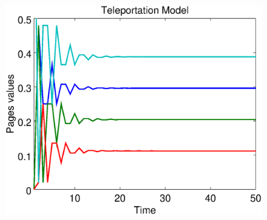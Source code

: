 \documentclass{beamer}
\begin{document}
\begin{frame}
\begin{figure}[!htb]
	\includegraphics[scale=0.25]{figures/50/teleportation.eps}
	\label{}
\end{figure}	
	
\end{frame}
\end{document}
